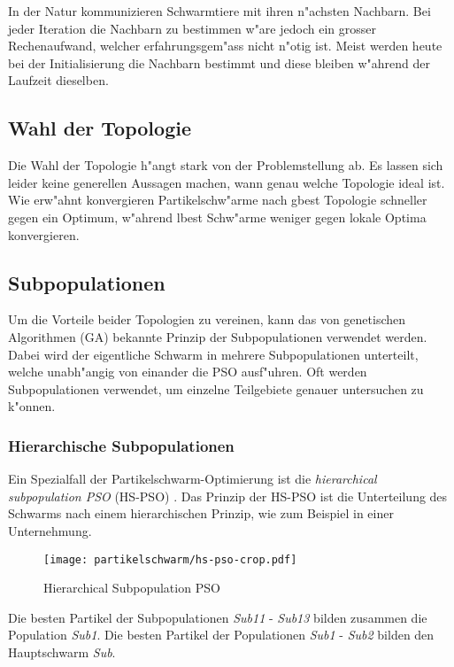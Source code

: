 In der Natur kommunizieren Schwarmtiere mit ihren n"achsten Nachbarn. Bei
jeder Iteration die Nachbarn zu bestimmen w"are jedoch ein grosser
Rechenaufwand, welcher erfahrungsgem"ass nicht n"otig ist. Meist werden
heute bei der Initialisierung die Nachbarn bestimmt und diese bleiben
w"ahrend der Laufzeit dieselben.

\subsection{Wahl der Topologie}
Die Wahl der Topologie h"angt stark von der Problemstellung ab. Es
lassen sich leider keine generellen Aussagen machen, wann genau welche
Topologie ideal ist. Wie erw"ahnt konvergieren Partikelschw"arme nach
gbest Topologie schneller gegen ein Optimum, w"ahrend lbest Schw"arme
weniger gegen lokale Optima konvergieren.

\subsection{Subpopulationen}
Um die Vorteile beider Topologien zu vereinen, kann das von genetischen
Algorithmen (GA) bekannte Prinzip der Subpopulationen verwendet
werden. Dabei wird der eigentliche Schwarm in mehrere Subpopulationen
unterteilt, welche unabh"angig von einander die PSO ausf"uhren. Oft werden
Subpopulationen verwendet, um einzelne Teilgebiete genauer untersuchen
zu k"onnen.


\subsubsection{Hierarchische Subpopulationen}
Ein Spezialfall der Partikelschwarm-Optimierung ist
die \textit{hierarchical subpopulation PSO} (HS-PSO)
\cite{ChuanLin-HSPSO}. Das Prinzip der HS-PSO ist die Unterteilung des
Schwarms nach einem hierarchischen Prinzip, wie zum Beispiel in einer
Unternehmung.

\begin{figure}[htbp]
	\centering
	\texttt{[image: partikelschwarm/hs-pso-crop.pdf]}\\
	\caption{Hierarchical Subpopulation PSO}
	\label{hs-pso}
\end{figure}

Die besten Partikel der Subpopulationen \textit{Sub11} - \textit{Sub13}
bilden zusammen die Population \textit{Sub1}. Die besten Partikel der
Populationen \textit{Sub1} - \textit{Sub2} bilden den Hauptschwarm
\textit{Sub}.

